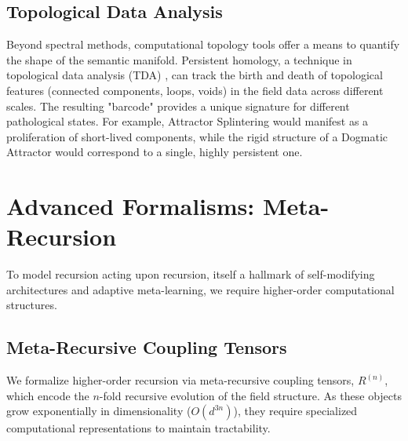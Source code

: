 \subsection{Topological Data Analysis}

Beyond spectral methods, computational topology tools offer a means to quantify the shape of the semantic manifold. Persistent homology, a technique in topological data analysis (TDA) \autocite{EdelsbrunnerHarer2010}, can track the birth and death of topological features (connected components, loops, voids) in the field data across different scales. The resulting "barcode" provides a unique signature for different pathological states. For example, Attractor Splintering would manifest as a proliferation of short-lived components, while the rigid structure of a Dogmatic Attractor would correspond to a single, highly persistent one.

\section{Advanced Formalisms: Meta-Recursion}
To model recursion acting upon recursion, itself a hallmark of self-modifying architectures and adaptive meta-learning, we require higher-order computational structures.

\subsection{Meta-Recursive Coupling Tensors}
We formalize higher-order recursion via meta-recursive coupling tensors, \(R^{(n)}\), which encode the \(n\)-fold recursive evolution of the field structure. As these objects grow exponentially in dimensionality (\(O(d^{3n})\)), they require specialized computational representations to maintain tractability.

